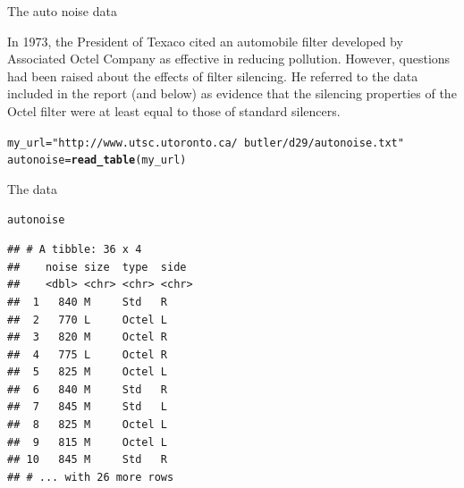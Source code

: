 \documentclass[unknownkeysallowed]{beamer}\usepackage[]{graphicx}\usepackage[]{color}
\makeatletter
\newcommand{\hlstr}[1]{\textcolor[rgb]{0.192,0.494,0.8}{#1}}%
\newcommand{\hlstd}[1]{\textcolor[rgb]{0.345,0.345,0.345}{#1}}%
\newcommand{\hlkwb}[1]{\textcolor[rgb]{0.69,0.353,0.396}{#1}}%
\newcommand{\hlkwd}[1]{\textcolor[rgb]{0.737,0.353,0.396}{\textbf{#1}}}%
\newenvironment{kframe}{%
 \def\at@end@of@kframe{}%
 \ifinner\ifhmode%
  \def\at@end@of@kframe{\end{minipage}}%
  \begin{minipage}{\columnwidth}%
 \fi\fi%
 \def\FrameCommand##1{\hskip\@totalleftmargin \hskip-\fboxsep
 \colorbox{shadecolor}{##1}\hskip-\fboxsep
     \hskip-\linewidth \hskip-\@totalleftmargin \hskip\columnwidth}%
 \MakeFramed {\advance\hsize-\width
   \@totalleftmargin\z@ \linewidth\hsize
   \@setminipage}}%
 {\par\unskip\endMakeFramed%
 \at@end@of@kframe}
\newenvironment{knitrout}{}{} %
\makeatother
\begin{document}
\begin{frame}[fragile]{The auto noise data}
  
  In 1973, the President of Texaco cited an automobile filter
  developed by Associated Octel Company as effective in reducing
  pollution. However, questions had been raised about the effects of
  filter silencing. He referred to the data included in the report
  (and below) as evidence
  that the silencing properties of the Octel filter were at least
  equal to those of standard silencers. 
 
\begin{knitrout}
\color{fgcolor}\begin{kframe}
\begin{alltt}
\hlstd{my_url}\hlkwb{=}\hlstr{"http://www.utsc.utoronto.ca/~butler/d29/autonoise.txt"}
\hlstd{autonoise}\hlkwb{=}\hlkwd{read_table}\hlstd{(my_url)}
\end{alltt}


{\ttfamily\noindent\itshape\color{messagecolor}{\#\# Parsed with column specification:\\\#\# cols(\\\#\#\ \  noise = col\_double(),\\\#\#\ \  size = col\_character(),\\\#\#\ \  type = col\_character(),\\\#\#\ \  side = col\_character()\\\#\# )}}\end{kframe}
\end{knitrout}
  
\end{frame}

\begin{frame}[fragile]{The data}
  
\begin{knitrout}
\color{fgcolor}\begin{kframe}
\begin{alltt}
\hlstd{autonoise}
\end{alltt}
\begin{verbatim}
## # A tibble: 36 x 4
##    noise size  type  side 
##    <dbl> <chr> <chr> <chr>
##  1   840 M     Std   R    
##  2   770 L     Octel L    
##  3   820 M     Octel R    
##  4   775 L     Octel R    
##  5   825 M     Octel L    
##  6   840 M     Std   R    
##  7   845 M     Std   L    
##  8   825 M     Octel L    
##  9   815 M     Octel L    
## 10   845 M     Std   R    
## # ... with 26 more rows
\end{verbatim}
\end{kframe}
\end{knitrout}
  
\end{frame}
\end{document}
